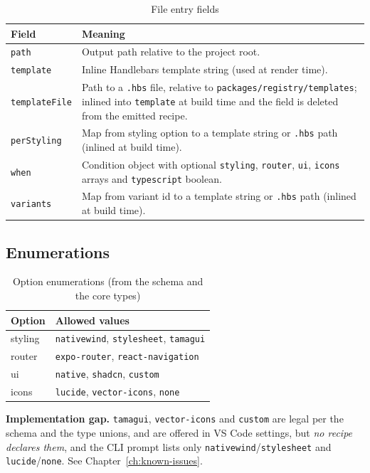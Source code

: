 \begin{longtable}{p{2.7cm}p{11.1cm}}
\caption{File entry fields}\\
\toprule
\textbf{Field} & \textbf{Meaning} \\
\midrule

\texttt{path} & Output path relative to the project root. \\
\texttt{template} & Inline Handlebars template string (used at render time). \\
\texttt{templateFile} & Path to a \texttt{.hbs} file, relative to
\texttt{packages/registry/templates}; inlined into \texttt{template} at build
time and the field is deleted from the emitted recipe. \\
\texttt{perStyling} & Map from styling option to a template string or \texttt{.hbs}
path (inlined at build time). \\
\texttt{when} & Condition object with optional \texttt{styling}, \texttt{router},
\texttt{ui}, \texttt{icons} arrays and \texttt{typescript} boolean. \\
\texttt{variants} & Map from variant id to a template string or \texttt{.hbs} path
(inlined at build time). \\
\bottomrule
\end{longtable}

\subsection*{Enumerations}

\begin{table}[H]
\centering
\caption{Option enumerations (from the schema and the core types)}
\begin{tabular}{p{3cm}p{10.8cm}}
\toprule
\textbf{Option} & \textbf{Allowed values} \\
\midrule
styling & \texttt{nativewind}, \texttt{stylesheet}, \texttt{tamagui} \\
router & \texttt{expo-router}, \texttt{react-navigation} \\
ui & \texttt{native}, \texttt{shadcn}, \texttt{custom} \\
icons & \texttt{lucide}, \texttt{vector-icons}, \texttt{none} \\
\bottomrule
\end{tabular}
\end{table}

\textbf{Implementation gap.} \texttt{tamagui}, \texttt{vector-icons} and
\texttt{custom} are legal per the schema and the type unions, and are offered in VS
Code settings, but \emph{no recipe declares them}, and the CLI prompt lists only
\texttt{nativewind}/\texttt{stylesheet} and \texttt{lucide}/\texttt{none}. See
Chapter~\ref{ch:known-issues}.

